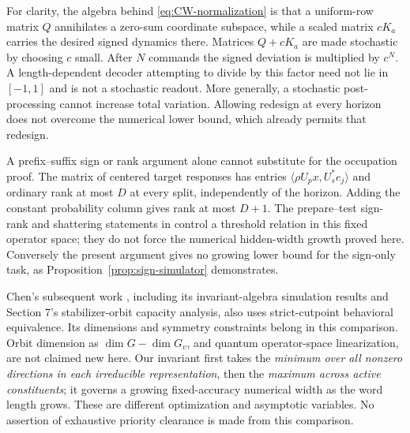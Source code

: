 For clarity, the algebra behind \eqref{eq:CW-normalization} is that a
uniform-row matrix $Q$ annihilates a zero-sum coordinate subspace,
while a scaled matrix $cK_a$ carries the desired signed dynamics
there. Matrices $Q+cK_a$ are made stochastic by choosing $c$ small.
After $N$ commands the signed deviation is multiplied by $c^N$.
A length-dependent decoder attempting to divide by this factor need
not lie in $[-1,1]$ and is not a stochastic readout. More generally,
a stochastic post-processing cannot increase total variation.
Allowing redesign at every horizon does not overcome the numerical
lower bound, which already permits that redesign.

A prefix--suffix sign or rank argument alone cannot substitute for
the occupation proof. The matrix of centered target responses has
entries $\langle \rho U_px,U_s^*e_j\rangle$ and ordinary rank at most
$D$ at every split, independently of the horizon. Adding the constant
probability column gives rank at most $D+1$. The prepare--test
sign-rank and shattering statements in \cite{CWmay} control a
threshold relation in this fixed operator space; they do not force
the numerical hidden-width growth proved here. Conversely the present
argument gives no growing lower bound for the sign-only task, as
Proposition~\ref{prop:sign-simulator} demonstrates.

Chen's subsequent work \cite{ChenSep}, including its invariant-algebra
simulation results and Section 7's stabilizer-orbit capacity analysis,
also uses strict-cutpoint behavioral equivalence. Its dimensions and
symmetry constraints belong in this comparison. Orbit dimension as
$\dim G-\dim G_v$, and quantum operator-space linearization, are not
claimed new here. Our invariant first takes the \emph{minimum over all
nonzero directions in each irreducible representation}, then the
\emph{maximum across active constituents}; it governs a growing
fixed-accuracy numerical width as the word length grows. These are
different optimization and asymptotic variables. No assertion of
exhaustive priority clearance is made from this comparison.
